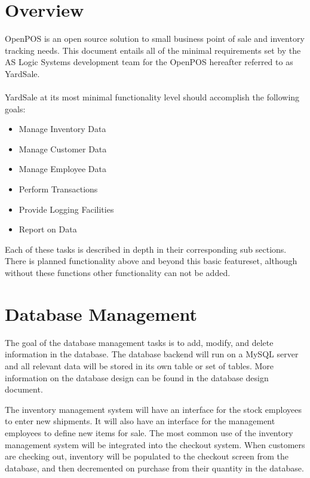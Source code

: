 \documentclass[a4paper,10pt]{article}
\title{}
\author{}
\begin{document}
\section{Overview}

OpenPOS is an open source solution to small business point of sale and inventory tracking needs. This document entails all of the minimal requirements set by the AS Logic Systems development team for the OpenPOS hereafter referred to as YardSale.\\
\\
YardSale at its most minimal functionality level should accomplish the following goals:

\begin{itemize}
	\item {Manage Inventory Data}
	\item {Manage Customer Data}
	\item {Manage Employee Data}
	\item {Perform Transactions}
	\item {Provide Logging Facilities}
	\item {Report on Data}
\end{itemize}

Each of these tasks is described in depth in their corresponding sub sections. There is planned functionality above and beyond this basic featureset, although without these functions other functionality can not be added.

\section{Database Management}

The goal of the database management tasks is to add, modify, and delete information in the database. The database backend will run on a MySQL server and all relevant data will be stored in its own table or set of tables. More information on the database design can be found in the database design document.

The inventory management system will have an interface for the stock employees to enter new shipments. It will also have an interface for the management employees to define new items for sale. The most common use of the inventory management system will be integrated into the checkout system. When customers are checking out, inventory will be populated to the checkout screen from the database, and then decremented on purchase from their quantity in the database.
\end{document}
